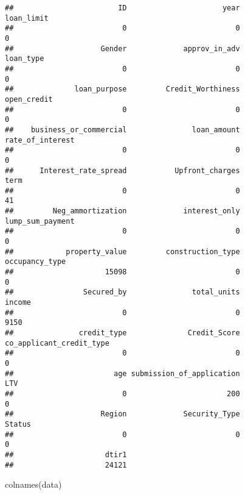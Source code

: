 \documentclass[
]{article}
\newenvironment{Shaded}{\begin{snugshade}}{\end{snugshade}}
\newcommand{\FunctionTok}[1]{\textcolor[rgb]{0.00,0.00,0.00}{#1}}
\newcommand{\NormalTok}[1]{#1}
\begin{document}
\begin{verbatim}
##                        ID                      year                loan_limit 
##                         0                         0                         0 
##                    Gender             approv_in_adv                 loan_type 
##                         0                         0                         0 
##              loan_purpose         Credit_Worthiness               open_credit 
##                         0                         0                         0 
##    business_or_commercial               loan_amount          rate_of_interest 
##                         0                         0                         0 
##      Interest_rate_spread           Upfront_charges                      term 
##                         0                         0                        41 
##         Neg_ammortization             interest_only          lump_sum_payment 
##                         0                         0                         0 
##            property_value         construction_type            occupancy_type 
##                     15098                         0                         0 
##                Secured_by               total_units                    income 
##                         0                         0                      9150 
##               credit_type              Credit_Score  co_applicant_credit_type 
##                         0                         0                         0 
##                       age submission_of_application                       LTV 
##                         0                       200                         0 
##                    Region             Security_Type                    Status 
##                         0                         0                         0 
##                     dtir1 
##                     24121
\end{verbatim}

\begin{Shaded}
\begin{Highlighting}[]
\FunctionTok{colnames}\NormalTok{(data)}
\end{Highlighting}
\end{Shaded}
\end{document}
